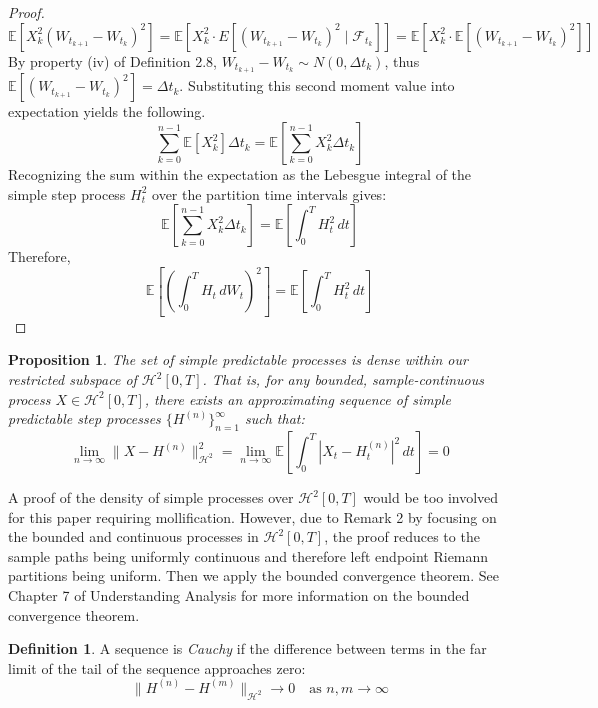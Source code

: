 \documentclass[12pt]{article}
\theoremstyle{definition}
\newtheorem{definition}{Definition}[section]
\theoremstyle{plain}
\newtheorem{proposition}{Proposition}[section]
\theoremstyle{remark}
\begin{document}
\begin{proof}
\[
\mathbb{E} \left[ X_k^2 (W_{t_{k+1}} - W_{t_k})^2 \right] = \mathbb{E} \left[ X_k^2 \cdot E[(W_{t_{k+1}} - W_{t_k})^2 \mid \mathcal{F}_{t_k}] \right] = \mathbb{E} \left[ X_k^2 \cdot \mathbb{E}[(W_{t_{k+1}} - W_{t_k})^2] \right]
\]
By property (iv) of Definition 2.8, $W_{t_{k+1}} - W_{t_k} \sim N(0, \Delta t_k)$, thus $\mathbb{E}[(W_{t_{k+1}} - W_{t_k})^2] = \Delta t_k$. Substituting this second moment value into expectation yields the following.
\[
\sum_{k=0}^{n-1} \mathbb{E} \left[ X_k^2 \right] \Delta t_k = \mathbb{E} \left[ \sum_{k=0}^{n-1} X_k^2 \Delta t_k \right]
\]
Recognizing the sum within the expectation as the Lebesgue integral of the simple step process $H_t^2$ over the partition time intervals gives:
\[
\mathbb{E} \left[ \sum_{k=0}^{n-1} X_k^2 \Delta t_k \right] = \mathbb{E} \left[ \int_0^T H_t^2 \, dt \right]
\]
Therefore,
\[
\mathbb{E} \left[ \left(\int_0^T H_t \, dW_t \right)^2 \right] = \mathbb{E} \left[ \int_0^T H_t^2 \, dt \right]
\]
\end{proof}

\begin{proposition}
The set of simple predictable processes is dense within our restricted subspace of $\mathcal{H}^2[0,T]$. That is, for any bounded, sample-continuous process $X \in \mathcal{H}^2[0,T]$, there exists an approximating sequence of simple predictable step processes $\{H^{(n)}\}_{n=1}^\infty$ such that:
\[
\lim_{n \to \infty} \|X - H^{(n)}\|_{\mathcal{H}^2}^2 = \lim_{n \to \infty} \mathbb{E}\left[ \int_0^T \left| X_t - H^{(n)}_t \right|^2 \, dt \right] = 0
\]
\end{proposition}

A proof of the density of simple processes over $\mathcal{H}^2[0,T]$ would be too involved for this paper requiring mollification.  However, due to Remark 2 by focusing on the bounded and continuous processes in $\mathcal{H}^2[0,T]$, the proof reduces to the sample paths being uniformly continuous and therefore left endpoint Riemann partitions being uniform.  Then we apply the bounded convergence theorem.  See Chapter 7 of Understanding Analysis \cite{Abbott} for more information on the bounded convergence theorem. 

\begin{definition}
A sequence is \textit{Cauchy} if the difference between terms in the far limit of the tail of the sequence approaches zero:
\[
\|H^{(n)} - H^{(m)}\|_{\mathcal{H}^2} \to 0 \quad \text{as } n,m \to \infty
\]
\end{definition}
\end{document}
